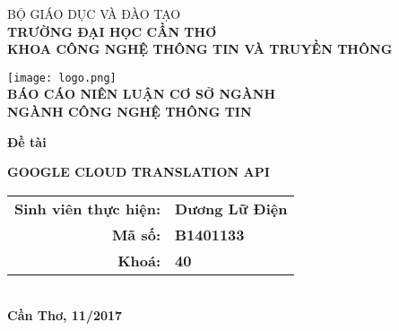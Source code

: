 \documentclass[../thesis.tex]{subfiles}
\begin{document}
\begin{titlepage}

\begin{center}

BỘ GIÁO DỤC VÀ ĐÀO TẠO\\
\textbf{TRƯỜNG ĐẠI HỌC CẦN THƠ\\}
\textbf{KHOA CÔNG NGHỆ THÔNG TIN VÀ TRUYỀN THÔNG\\[1cm]}

\texttt{[image: logo.png]}\\[1cm]

\textbf{BÁO CÁO NIÊN LUẬN CƠ SỞ NGÀNH\\}
\textbf{NGÀNH CÔNG NGHỆ THÔNG TIN\\[2cm]}

\begin{large}
\textbf{Đề tài\\[0.5cm]}
\end{large}
\textbf{{\LARGE GOOGLE CLOUD TRANSLATION API}}
\\[4cm]

\begin{tabular}{ r l }
\textbf{Sinh viên thực hiện:} & \textbf{Dương Lữ Điện}\\ 
\textbf{Mã số:} & \textbf{B1401133}\\  
\textbf{Khoá:} & \textbf{40}   
\end{tabular}
\\[4cm]

\textbf{Cần Thơ, 11/2017}

\end{center}

\end{titlepage}
\end{document}
